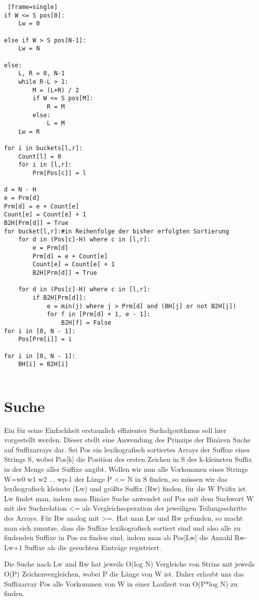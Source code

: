 \documentclass[twoside]{article}
\begin{document}
\begin{lstlisting} [frame=single]
if W <= S pos[0]:
    Lw = 0

else if W > S pos[N-1]:
    Lw = N

else:
    L, R = 0, N-1
    while R-L > 1:
        M = (L+R) / 2
        if W <= S pos[M]:
            R = M
        else:
            L = M
    Lw = R

for i in buckets[l,r]:
    Count[l] = 0
    for i in [l,r]:
        Prm[Pos[c]] = l

d = N - H
e = Prm[d]
Prm[d] = e + Count[e]
Count[e] = Count[e] + 1
B2H[Prm[d]] = True
for bucket[l,r]:#in Reihenfolge der bisher erfolgten Sortierung
    for d in (Pos[c]-H) where c in [l,r]:
        e = Prm[d]
        Prm[d] = e + Count[e]
        Count[e] = Count[e] + 1
        B2H[Prm[d]] = True

    for d in (Pos[c]-H) where c in [l,r]:
        if B2H[Prm[d]]:
            e = min(j) where j > Prm[d] and (BH[j] or not B2H[j])
            for f in [Prm[d] + 1, e - 1]:
                B2H[f] = False
for i in [0, N - 1]:
    Pos[Prm[i]] = i

for i in [0, N - 1]:
    BH[i] = B2H[i]


\end{lstlisting}

\section{Suche}
Ein für seine Einfachheit erstaunlich effizienter Suchalgorithmus soll hier
vorgestellt werden. Dieser stellt eine Anwendung des Prinzips der Binären Suche
auf Suffixarrays dar.
Sei Pos ein lexikografisch sortiertes Arrays der Suffixe eines Strings S, wobei
Pos[k] die Position des ersten Zeichen in S des k-kleinsten Suffix in der Menge
aller Suffixe angibt.
Wollen wir nun alle Vorkommen eines Strings W=w0 w1 w2 ... wp-1 der Länge P <= N
in S finden, so müssen wir das lexikografisch kleinste (Lw) und größte Suffix (Rw) finden,
für die W Präfix ist.
Lw findet man, indem man Binäre Suche anwendet auf Pos mit dem Suchwort W mit der
Suchrelation <= als Vergleichsoperation der jeweiligen Teilungsschritte des Arrays.
Für Rw analog mit >=.
Hat man Lw und Rw gefunden, so macht man sich zunutze, dass die Suffixe lexikografisch sortiert
sind und also alle zu findenden Suffixe in Pos zu finden sind, indem man ab Pos[Lw]
die Anzahl Rw-Lw+1 Suffixe als die gesuchten Einträge registriert.

Die Suche nach Lw und Rw hat jeweils O(log N) Vergleiche von Strins mit jeweils
O(P) Zeichenvergleichen, wobei P die Länge von W ist. Daher erlaubt uns das Suffixarray
Pos alle Vorkommen von W in einer Laufzeit von O(P*log N) zu finden.
\end{document}
